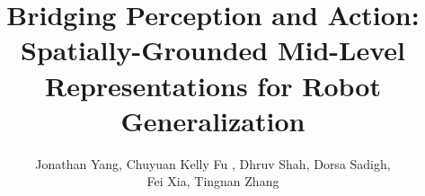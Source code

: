 \documentclass[conference,dvipsnames]{IEEEtran}
\begin{document}
\title{Bridging Perception and Action: Spatially-Grounded Mid-Level Representations for Robot Generalization}



\author{Jonathan Yang, Chuyuan Kelly Fu ,  Dhruv Shah, Dorsa Sadigh, \\ Fei Xia, Tingnan Zhang \\
}




% 


\maketitle
\end{document}
